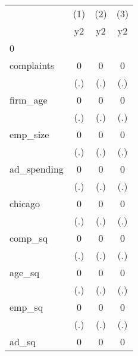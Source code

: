 {
\def\sym#1{\ifmmode^{#1}\else\(^{#1}\)\fi}
\begin{tabular}{l*{3}{c}}
\hline\hline
            &\multicolumn{1}{c}{(1)}&\multicolumn{1}{c}{(2)}&\multicolumn{1}{c}{(3)}\\
            &\multicolumn{1}{c}{y2}&\multicolumn{1}{c}{y2}&\multicolumn{1}{c}{y2}\\
\hline
0           &                     &                     &                     \\
complaints  &           0         &           0         &           0         \\
            &         (.)         &         (.)         &         (.)         \\
[1em]
firm\_age    &           0         &           0         &           0         \\
            &         (.)         &         (.)         &         (.)         \\
[1em]
emp\_size    &           0         &           0         &           0         \\
            &         (.)         &         (.)         &         (.)         \\
[1em]
ad\_spending &           0         &           0         &           0         \\
            &         (.)         &         (.)         &         (.)         \\
[1em]
chicago     &           0         &           0         &           0         \\
            &         (.)         &         (.)         &         (.)         \\
[1em]
comp\_sq     &           0         &           0         &           0         \\
            &         (.)         &         (.)         &         (.)         \\
[1em]
age\_sq      &           0         &           0         &           0         \\
            &         (.)         &         (.)         &         (.)         \\
[1em]
emp\_sq      &           0         &           0         &           0         \\
            &         (.)         &         (.)         &         (.)         \\
[1em]
ad\_sq       &           0         &           0         &           0         \\

\end{tabular}}
